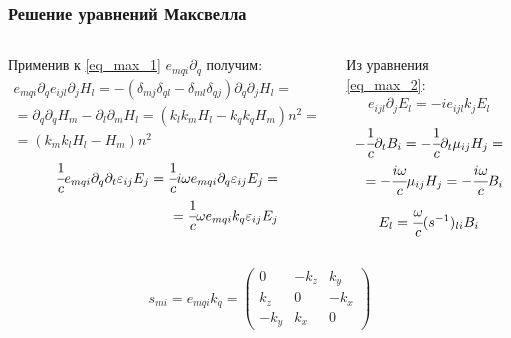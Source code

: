 \documentclass[handout]{beamer}
\newcommand{\inner}[1]{\left( #1 \right)}
\newcommand{\eps}{\varepsilon}
\begin{document}
\begin{frame}
    \frametitle{Решение уравнений Максвелла}
    \begin{columns}
        \begin{column}{0.6\textwidth}
            Применив к \ref{eq_max_1} $e_{mqi} \partial_q$ получим:
            \begin{eqnarray*}
                e_{mqi} \partial_q e_{ijl} \partial_j H_l = 
                -\inner{\delta_{mj}\delta_{ql} - \delta_{ml}\delta_{qj}}
                \partial_q\partial_j H_l = \\
                = \partial_q\partial_q H_m - \partial_l\partial_m H_l = 
                (k_l k_m H_l - k_q k_q H_m)n^2 =\\
                = (k_m k_l H_l - H_m)n^2
            \end{eqnarray*}
            \begin{eqnarray*}
                \cfrac{1}{c}e_{mqi} \partial_q \partial_t \eps_{ij} E_j = 
                \cfrac{1}{c} i\omega e_{mqi} \partial_q \eps_{ij} E_j =\\
                = \cfrac{1}{c} \omega e_{mqi} k_q \eps_{ij} E_j
            \end{eqnarray*}
        \end{column}

        \begin{column}{0.35\textwidth}
            Из уравнения \ref{eq_max_2}:
            \begin{eqnarray*}
                e_{ijl} \partial_j E_l 
                = -i e_{ijl} k_j E_l
            \end{eqnarray*}
            \begin{eqnarray*}
                -\cfrac{1}{c}\partial_t B_i = 
                -\cfrac{1}{c}\partial_t \mu_{ij} H_j = \\
                = - \cfrac{i\omega}{c} \mu_{ij} H_j = 
                -\cfrac{i\omega}{c} B_i
            \end{eqnarray*}
            \begin{equation*}
                E_l = \cfrac{\omega}{c} (s^{-1})_{li}  B_i
            \end{equation*}
        \end{column}
      \end{columns}

      \begin{gather}
        s_{mi} = e_{mqi} k_q = 
        \begin{pmatrix}
            0& -k_z& k_y\\
            k_z& 0& -k_x\\
            -k_y& k_x& 0
        \end{pmatrix}
    \end{gather}
\end{frame}
\end{document}
